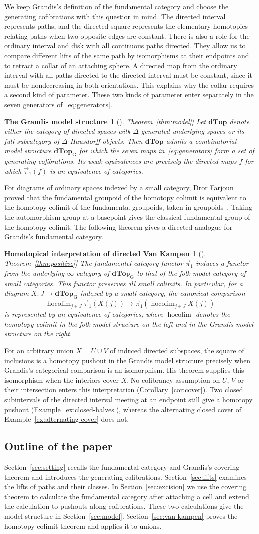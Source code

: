 \documentclass[12pt,a4paper]{amsart}
\newtheorem*{introVanKampen}{Homotopical interpretation of directed Van Kampen}
\newtheorem*{introModel}{The Grandis model structure}
\theoremstyle{definition}
\renewcommand{\vec}{\overrightarrow}
\newcommand{\D}{\mathbf{dTop}}
\newcommand{\MG}{\D_{\mathrm G}}
\newcommand{\PiC}{\vec{\pi}_1}
\DeclareMathOperator*{\hocolim}{hocolim}
\newcommand{\theoremlink}[1]{\hyperref[#1]{Theorem~\ref*{#1}}}
\newcommand{\GrandisModelStatement}{%
Let $\D$ denote either the category of directed spaces with $\Delta$-generated underlying spaces or its full subcategory of $\Delta$-Hausdorff objects. Then $\D$ admits a combinatorial model structure $\MG$ for which the seven maps in~\eqref{eq:generators} form a set of generating cofibrations. Its weak equivalences are precisely the directed maps $f$ for which $\PiC(f)$ is an equivalence of categories.
}
\newcommand{\VanKampenStatement}{%
The fundamental category functor $\PiC$ induces a functor from the underlying $\infty$-category of $\MG$ to that of the folk model category of small categories. This functor preserves all small colimits. In particular, for a diagram $X\colon J\to\MG$ indexed by a small category, the canonical comparison
\[
 \hocolim_{j\in J}\PiC(X(j))\longrightarrow\PiC\!\left(\hocolim_{j\in J}X(j)\right)
\]
is represented by an equivalence of categories, where $\hocolim$ denotes the homotopy colimit in the folk model structure on the left and in the Grandis model structure on the right.
}
\begin{document}
We keep Grandis's definition of the fundamental category and choose the generating cofibrations with this question in mind. The directed interval represents paths, and the directed square represents the elementary homotopies relating paths when two opposite edges are constant. There is also a role for the ordinary interval and disk with all continuous paths directed. They allow us to compare different lifts of the same path by isomorphisms at their endpoints and to retract a collar of an attaching sphere. A directed map from the ordinary interval with all paths directed to the directed interval must be constant, since it must be nondecreasing in both orientations. This explains why the collar requires a second kind of parameter. These two kinds of parameter enter separately in the seven generators of~\eqref{eq:generators}.

\begin{introModel}[\theoremlink{thm:model}]
\GrandisModelStatement
\end{introModel}

For diagrams of ordinary spaces indexed by a small category, Dror Farjoun proved that the fundamental groupoid of the homotopy colimit is equivalent to the homotopy colimit of the fundamental groupoids, taken in groupoids~\cite[Theorem~1.1]{Farjoun2004}. Taking the automorphism group at a basepoint gives the classical fundamental group of the homotopy colimit. The following theorem gives a directed analogue for Grandis's fundamental category.

\begin{introVanKampen}[\theoremlink{thm:positive}]
\VanKampenStatement
\end{introVanKampen}

For an arbitrary union $X=U\cup V$ of induced directed subspaces, the square of inclusions is a homotopy pushout in the Grandis model structure precisely when Grandis's categorical comparison is an isomorphism. His theorem supplies this isomorphism when the interiors cover $X$. No cofibrancy assumption on $U$, $V$ or their intersection enters this interpretation (Corollary~\ref{cor:cover}). Two closed subintervals of the directed interval meeting at an endpoint still give a homotopy pushout (Example~\ref{ex:closed-halves}), whereas the alternating closed cover of Example~\ref{ex:alternating-cover} does not.

\subsection*{Outline of the paper}
Section~\ref{sec:setting} recalls the fundamental category and Grandis's covering theorem and introduces the generating cofibrations. Section~\ref{sec:lifts} examines the lifts of paths and their classes. In Section~\ref{sec:excision} we use the covering theorem to calculate the fundamental category after attaching a cell and extend the calculation to pushouts along cofibrations. These two calculations give the model structure in Section~\ref{sec:model}. Section~\ref{sec:van-kampen} proves the homotopy colimit theorem and applies it to unions.
\end{document}
